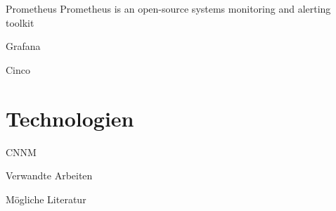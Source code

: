 \documentclass[12pt, pdf, xcolor={table, dvipsnames}, paperheight=8cm,paperwidth=12cm]{beamer}
\begin{document}
\begin{frame}{Prometheus}
	Prometheus is an open-source systems monitoring and alerting toolkit
\end{frame}

\begin{frame}{Grafana}
\end{frame}

\begin{frame}{Cinco}
\end{frame}

\section{Technologien}
\begin{frame}{CNNM}
\end{frame}



\begin{frame}{Verwandte Arbeiten}
\end{frame}

\begin{frame}{Mögliche Literatur}
\end{frame}
\end{document}
